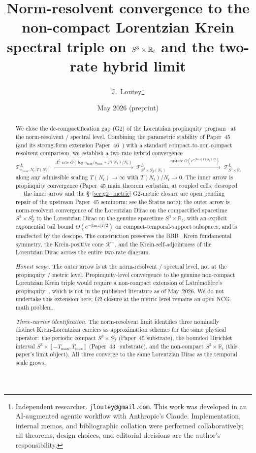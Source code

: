 \documentclass[11pt,a4paper]{article}
\title{Norm-resolvent convergence to the non-compact Lorentzian Krein\\
spectral triple on $\sthree\times\R_{t}$ and the two-rate hybrid limit}
\author{J.~Loutey\thanks{Independent researcher. \texttt{jloutey@gmail.com}.
This work was developed in an AI-augmented agentic workflow with
Anthropic's Claude. Implementation, internal memos, and bibliographic
collation were performed collaboratively; all theorems, design choices,
and editorial decisions are the author's responsibility.}}
\date{May 2026 (preprint)}
\theoremstyle{plain}
\theoremstyle{definition}
\newcommand{\nmax}{n_{\max}}
\newcommand{\Nt}{N_{t}}
\newcommand{\sthree}{S^{3}}
\newcommand{\SoneT}{S^{1}_{T}}
\newcommand{\Krein}{\mathcal{K}}
\newcommand{\Tcal}{\mathcal{T}}
\newcommand{\R}{\mathbb{R}}
\newcommand{\Lprop}{\Lambda^{L}}
\newcommand{\Kplus}{\Krein^{+}}
\newcommand{\nr}{\mathrm{nr}}
\begin{document}
\maketitle

\begin{abstract}
We close the de-compactification gap (G2) of the Lorentzian propinquity
program~\cite{paper45,paper46} at the norm-resolvent / spectral level.
Combining the parametric stability of Paper~45~\cite{paper45} (and
its strong-form extension Paper~46~\cite{paper46}) with a standard
compact-to-non-compact resolvent comparison, we establish a two-rate
hybrid convergence
\[
\Tcal^{L}_{\nmax, \Nt, T(\Nt)}
\;\xrightarrow{\;\Lprop\text{-rate } O(\log\nmax/\nmax + T(\Nt)/\Nt)\;}\;
\Tcal^{L}_{\sthree \times \SoneT(\Nt)}
\;\xrightarrow{\;\nr\text{-rate } O(e^{-|\mathrm{Im}\,z|\,T(\Nt)/2})\;}\;
\Tcal^{L}_{\sthree \times \R_{t}}
\]
along any admissible scaling $T(\Nt)\to\infty$ with $T(\Nt)/\Nt\to 0$.
The inner arrow is propinquity convergence (Paper~45 main theorem
verbatim, at coupled cells; descoped — the inner arrow and the
\S~\ref{sec:g2_metric} G2-metric closure are open pending repair of
the upstream Paper~45 seminorm; see the Status note); the outer arrow is norm-resolvent
convergence of the Lorentzian Dirac on the compactified spacetime
$\sthree\times\SoneT$ to the Lorentzian Dirac on the genuine spacetime
$\sthree\times\R_{t}$, with an explicit exponential tail bound
$O(e^{-|\mathrm{Im}\,z|\,T/2})$ on compact-temporal-support subspaces,
and is unaffected by the descope.
The construction preserves the BBB~\cite{bizi_brouder_besnard2018}
Krein fundamental symmetry, the Krein-positive cone $\Kplus$, and the
Krein-self-adjointness of the Lorentzian Dirac across the entire
two-rate diagram.

\medskip
\noindent\emph{Honest scope.} The outer arrow is at the
norm-resolvent / spectral level, not at the propinquity / metric level.
Propinquity-level convergence to the genuine non-compact Lorentzian
Krein triple would require a non-compact extension of
Latr\'emoli\`ere's propinquity~\cite{latremoliere_metric_st_2017,
latremoliere2018}, which is not in the published literature as of
May~2026. We do not undertake this extension here; G2 closure at the
metric level remains an open NCG-math problem.

\medskip
\noindent\emph{Three-carrier identification.} The norm-resolvent limit
identifies three nominally distinct Krein-Lorentzian carriers as
approximation schemes for the same physical operator:\ the periodic
compact $\sthree\times\SoneT$ (Paper~45 substrate), the bounded
Dirichlet interval $\sthree\times[-T_{\max}, T_{\max}]$
(Paper~43~\cite{paper43} substrate), and the non-compact
$\sthree\times\R_{t}$ (this paper's limit object). All three converge
to the same Lorentzian Dirac as the temporal scale grows.


\end{abstract}
\end{document}
